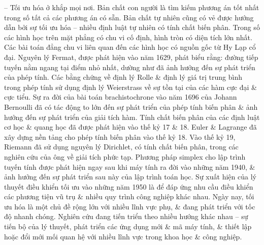 \documentclass{article}
\begin{document}
\begin{itemize}
    -- Tối ưu hóa ở khắp mọi nơi. Bản chất con người là tìm kiếm phương án tốt nhất trong số tất cả các phương án có sẵn. Bản chất tự nhiên cũng có vẻ được hướng dẫn bởi sự tối ưu hóa -- nhiều định luật tự nhiên có tính chất biến phân. Trong số các hình học trên mặt phẳng có chu vi cố định, hình tròn có diện tích lớn nhất. Các bài toán đẳng chu vi liên quan đến các hình học có nguồn gốc từ Hy Lạp cổ đại. Nguyên lý Fermat, được phát hiện vào năm 1629, phát biểu rằng: đường tiếp tuyến nằm ngang tại điểm nhỏ nhất, dường như đã ảnh hưởng đến sự phát triển của phép tính. Các bằng chứng về định lý Rolle \& định lý giá trị trung bình trong phép tính sử dụng định lý Weierstrass về sự tồn tại của các hàm cực đại \& cực tiểu. Sự ra đời của bài toán brachistochrone vào năm 1696 của {\sc Johann Bernoulli} đã có tác động to lớn đến sự phát triển của phép tính biến phân \& ảnh hưởng đến sự phát triển của giải tích hàm. Tính chất biến phân của các định luật cơ học \& quang học đã được phát hiện vào thế kỷ 17 \& 18. Euler \& Lagrange đã xây dựng nền tảng cho phép tính biến phân vào thế kỷ 18. Vào thế kỷ 19, {\sc Riemann} đã sử dụng nguyên lý Dirichlet, có tính chất biến phân, trong các nghiên cứu của ông về giải tích phức tạp. Phương pháp simplex cho lập trình tuyến tính được phát hiện ngay sau khi máy tính ra đời vào những năm 1940, \& ảnh hưởng đến sự phát triển sau này của lập trình toán học. Sự xuất hiện của lý thuyết điều khiển tối ưu vào những năm 1950 là để đáp ứng nhu cầu điều khiển các phương tiện vũ trụ \& nhiều quy trình công nghiệp khác nhau. Ngày nay, tối ưu hóa là một chủ đề rộng lớn với nhiều lĩnh vực phụ, \& đang phát triển với tốc độ nhanh chóng. Nghiên cứu đang tiến triển theo nhiều hướng khác nhau -- sự tiến bộ của lý thuyết, phát triển các ứng dụng mới \& mã máy tính, \& thiết lập hoặc đổi mới mối quan hệ với nhiều lĩnh vực trong khoa học \& công nghiệp.
    

\end{itemize}
\end{document}
